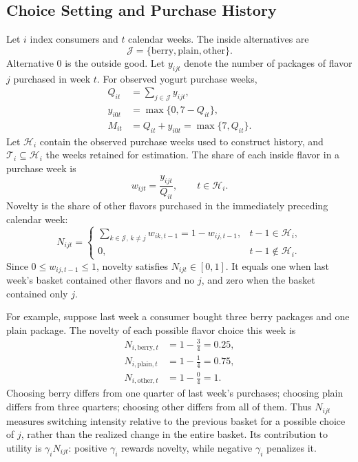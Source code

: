 \documentclass[12pt]{article}
\theoremstyle{definition}
\theoremstyle{remark}
\begin{document}
\subsection{Choice Setting and Purchase History}
Let $i$ index consumers and $t$ calendar weeks. The inside alternatives are
\begin{equation*}
 \mathcal J=\{\mathrm{berry},\mathrm{plain},\mathrm{other}\}.
\end{equation*}
Alternative $0$ is the outside good. Let $y_{ijt}$ denote the number of packages
of flavor $j$ purchased in week $t$. For observed yogurt purchase weeks,
\begin{align}
 Q_{it}&=\sum_{j\in\mathcal J}y_{ijt},\\
 y_{i0t}&=\max\{0,7-Q_{it}\},\\
 M_{it}&=Q_{it}+y_{i0t}=\max\{7,Q_{it}\}.
\end{align}
Let $\mathcal H_i$ contain the observed purchase weeks used to construct history,
and $\mathcal T_i\subseteq\mathcal H_i$ the weeks retained for estimation.
The share of each inside flavor in a purchase week is
\begin{equation}
 w_{ijt}=\frac{y_{ijt}}{Q_{it}},\qquad t\in\mathcal H_i.
\end{equation}
Novelty is the share of other flavors purchased in the immediately preceding
calendar week:
\begin{equation}
 N_{ijt}=\begin{cases}
 \displaystyle\sum_{k\in\mathcal J,\,k\ne j}w_{ik,t-1}=1-w_{ij,t-1},
 &t-1\in\mathcal H_i,\\[3pt]
 0,&t-1\notin\mathcal H_i.
 \end{cases}
 \label{eq:empirical-novelty}
\end{equation}
Since $0\le w_{ij,t-1}\le1$, novelty satisfies $N_{ijt}\in[0,1]$.
It equals one when last week's basket contained other flavors and no $j$, and
zero when the basket contained only $j$.

For example, suppose last week a consumer bought three berry packages and one
plain package. The novelty of each possible flavor choice this week is
\begin{equation}
 \begin{aligned}
 N_{i,\mathrm{berry},t}&=1-\frac{3}{4}=0.25,\\
 N_{i,\mathrm{plain},t}&=1-\frac{1}{4}=0.75,\\
 N_{i,\mathrm{other},t}&=1-\frac{0}{4}=1.
 \end{aligned}
 \label{eq:novelty-example}
\end{equation}
Choosing berry differs from one quarter of last week's purchases; choosing
plain differs from three quarters; choosing other differs from all of them.
Thus $N_{ijt}$ measures switching intensity relative to the previous basket
for a possible choice of $j$, rather than the realized change in the entire
basket. Its contribution to utility is $\gamma_iN_{ijt}$: positive $\gamma_i$
rewards novelty, while negative $\gamma_i$ penalizes it.
\end{document}
